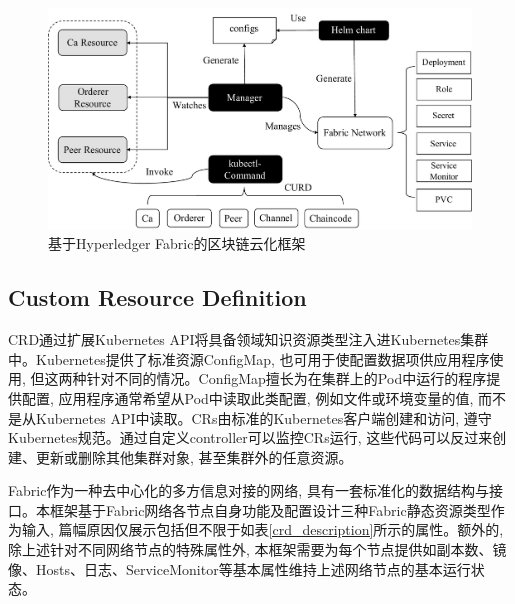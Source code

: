 \begin{figure}[h] %
    \centering %
    \includegraphics[width=1.0\textwidth]{FIGs/chapter4/framework.pdf} %
    \caption{基于Hyperledger Fabric的区块链云化框架} %
    \label{framework} %
\end{figure}%

\subsection{Custom Resource Definition}\label{section: Custom_Resource_Definition}

CRD通过扩展Kubernetes API将具备领域知识资源类型注入进Kubernetes集群中。Kubernetes提供了标准资源ConfigMap, 也可用于使配置数据项供应用程序使用, 但这两种针对不同的情况。ConfigMap擅长为在集群上的Pod中运行的程序提供配置, 应用程序通常希望从Pod中读取此类配置, 例如文件或环境变量的值, 而不是从Kubernetes API中读取。CRs由标准的Kubernetes客户端创建和访问, 遵守Kubernetes规范。通过自定义controller可以监控CRs运行, 这些代码可以反过来创建、更新或删除其他集群对象, 甚至集群外的任意资源。

Fabric作为一种去中心化的多方信息对接的网络, 具有一套标准化的数据结构与接口。本框架基于Fabric网络各节点自身功能及配置\footnotemark[1]\footnotemark[2]\footnotemark[3]设计三种Fabric静态资源类型作为输入, 篇幅原因仅展示包括但不限于如表\ref{crd_description}所示的属性。额外的, 除上述针对不同网络节点的特殊属性外, 本框架需要为每个节点提供如副本数、镜像、Hosts、日志、ServiceMonitor等基本属性维持上述网络节点的基本运行状态。

